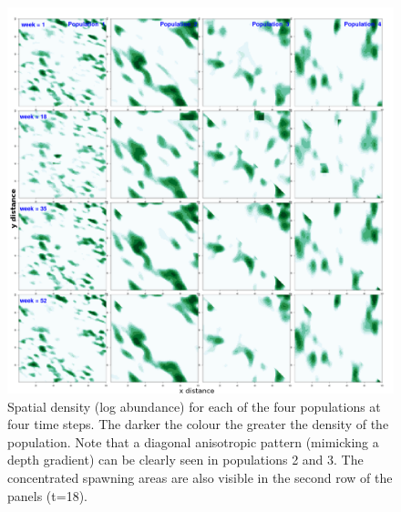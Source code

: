 \documentclass[review]{elsarticle}
\begin{document}
\clearpage


\begin{figure}[!ht]
	\includegraphics[width = \linewidth]{Plots/pop_dist}
	\caption{Spatial density (log abundance) for each of the four
		populations at four time steps. The darker the colour the
		greater the density of the population. Note that a diagonal
		anisotropic pattern (mimicking a depth gradient) can be
		clearly seen in populations 2 and 3. The concentrated spawning
		areas are also visible in the second row of the panels
		(t=18).}
	\label{fig:9}
\end{figure}	
\end{document}
